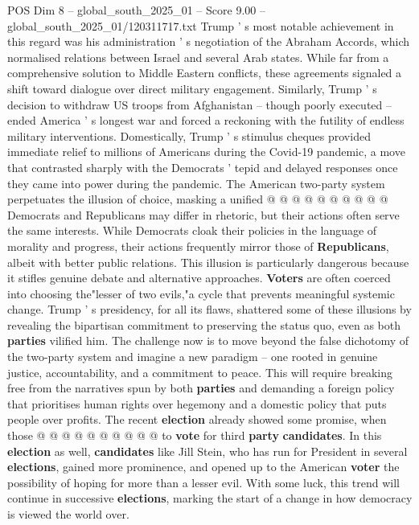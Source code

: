 \begin{textsample}{POS Dim 8 – global\_south\_2025\_01 – Score 9.00 – global\_south\_2025\_01/120311717.txt}
Trump ' s most notable achievement in this regard was his administration ' s negotiation of the Abraham Accords, which normalised relations between Israel and several Arab states.
While far from a comprehensive solution to Middle Eastern conflicts, these agreements signaled a shift toward dialogue over direct military engagement.
Similarly, Trump ' s decision to withdraw US troops from Afghanistan -- though poorly executed -- ended America ' s longest war and forced a reckoning with the futility of endless military interventions.
Domestically, Trump ' s stimulus cheques provided immediate relief to millions of Americans during the Covid-19 pandemic, a move that contrasted sharply with the Democrats ' tepid and delayed responses once they came into power during the pandemic.
The American two-party system perpetuates the illusion of choice, masking a unified @ @ @ @ @ @ @ @ @ @ Democrats and Republicans may differ in rhetoric, but their actions often serve the same interests.
While Democrats cloak their policies in the language of morality and progress, their actions frequently mirror those of \textbf{Republicans}, albeit with better public relations.
This illusion is particularly dangerous because it stifles genuine debate and alternative approaches. \textbf{Voters} are often coerced into choosing the"lesser of two evils,"a cycle that prevents meaningful systemic change.
Trump ' s presidency, for all its flaws, shattered some of these illusions by revealing the bipartisan commitment to preserving the status quo, even as both \textbf{parties} vilified him.
The challenge now is to move beyond the false dichotomy of the two-party system and imagine a new paradigm -- one rooted in genuine justice, accountability, and a commitment to peace.
This will require breaking free from the narratives spun by both \textbf{parties} and demanding a foreign policy that prioritises human rights over hegemony and a domestic policy that puts people over profits.
The recent \textbf{election} already showed some promise, when those @ @ @ @ @ @ @ @ @ @ to \textbf{vote} for third \textbf{party} \textbf{candidates}.
In this \textbf{election} as well, \textbf{candidates} like Jill Stein, who has run for President in several \textbf{elections}, gained more prominence, and opened up to the American \textbf{voter} the possibility of hoping for more than a lesser evil.
With some luck, this trend will continue in successive \textbf{elections}, marking the start of a change in how democracy is viewed the world over.

\end{textsample}
